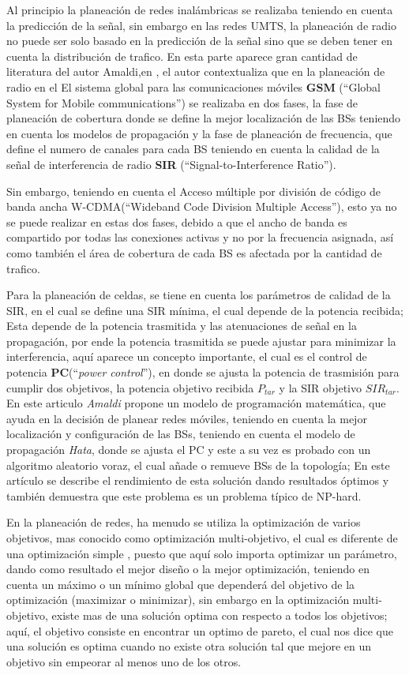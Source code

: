 \documentclass[]{article}
\begin{document}
Al principio la planeación de redes inalámbricas se realizaba teniendo
en cuenta la predicción de la señal, sin embargo en las redes UMTS, la
planeación de radio no puede ser solo basado en la predicción de la
señal sino que se deben tener en cuenta la distribución de trafico. En
esta parte aparece gran cantidad de literatura del autor Amaldi,en
\cite{Amaldi2003}, el autor contextualiza que en la planeación de radio
en el El sistema global para las comunicaciones móviles \textbf{GSM}
(``Global System for Mobile communications'') se realizaba en dos fases,
la fase de planeación de cobertura donde se define la mejor localización
de las BSs teniendo en cuenta los modelos de propagación y la fase de
planeación de frecuencia, que define el numero de canales para cada BS
teniendo en cuenta la calidad de la señal de interferencia de radio
\textbf{SIR} (``Signal-to-Interference Ratio'').

Sin embargo, teniendo en cuenta el Acceso múltiple por división de
código de banda ancha W-CDMA(``Wideband Code Division Multiple
Access''), esto ya no se puede realizar en estas dos fases, debido a que
el ancho de banda es compartido por todas las conexiones activas y no
por la frecuencia asignada, así como también el área de cobertura de
cada BS es afectada por la cantidad de trafico.

Para la planeación de celdas, se tiene en cuenta los parámetros de
calidad de la SIR, en el cual se define una SIR mínima, el cual depende
de la potencia recibida; Esta depende de la potencia trasmitida y las
atenuaciones de señal en la propagación, por ende la potencia trasmitida
se puede ajustar para minimizar la interferencia, aquí aparece un
concepto importante, el cual es el control de potencia
\textbf{PC}(``\emph{power control}''), en donde se ajusta la potencia de
trasmisión para cumplir dos objetivos, la potencia objetivo recibida
\(P_{tar}\) y la SIR objetivo \(SIR_{tar}\). En este articulo
\emph{Amaldi} propone un modelo de programación matemática, que ayuda en
la decisión de planear redes móviles, teniendo en cuenta la mejor
localización y configuración de las BSs, teniendo en cuenta el modelo de
propagación \emph{Hata}, donde se ajusta el PC y este a su vez es
probado con un algoritmo aleatorio voraz, el cual añade o remueve BSs de
la topología; En este artículo se describe el rendimiento de esta
solución dando resultados óptimos y también demuestra que este problema
es un problema típico de NP-hard.

En la planeación de redes, ha menudo se utiliza la optimización de
varios objetivos, mas conocido como optimización multi-objetivo, el cual
es diferente de una optimización simple , puesto que aquí solo importa
optimizar un parámetro, dando como resultado el mejor diseño o la mejor
optimización, teniendo en cuenta un máximo o un mínimo global que
dependerá del objetivo de la optimización (maximizar o minimizar), sin
embargo en la optimización multi-objetivo, existe mas de una solución
optima con respecto a todos los objetivos; aquí, el objetivo consiste en
encontrar un optimo de pareto, el cual nos dice que una solución es
optima cuando no existe otra solución tal que mejore en un objetivo sin
empeorar al menos uno de los otros.
\end{document}
